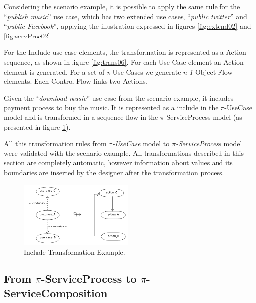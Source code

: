 \begin{exampl}
Considering the scenario example, it is possible to apply
the same rule for the ``\textit{publish music}'' use case, which has two
extended use cases, ``\textit{public twitter}'' and ``\textit{public
Facebook}'', applying the illustration expressed in figures \ref{fig:extend02}
and \ref{fig:servProc02}.  
\end{exampl}

For the {\sc Include} use case elements, the transformation is represented as a
{\sc Action} sequence, as shown in figure \ref{fig:trans06}. For each {\sc Use
Case} element an {\sc Action} element  is generated. For a set of \textit{n}
{\sc Use Cases} we generate \textit{n-1} {\sc Object Flow} elements. Each
{\sc Control Flow} links two {\sc Actions}. 


\begin{exampl}
Given the ``\textit{download music}'' use case from the scenario example, it
includes payment process to buy the music. It is represented as a include in the $\pi$-UseCase model and is
transformed in a sequence flow in the $\pi$-ServiceProcess model (as presented
in figure \ref{fig:include}).
\end{exampl}
  

All this transformation rules from \textit{$\pi$-UseCase} model to
\textit{$\pi$-ServiceProcess} model were validated with the scenario example.
All transformations described in this section are completely automatic, however
information about values and its boundaries are inserted by the designer after
the transformation process.


\begin{figure}[ht!]
\centering
\includegraphics[width=0.5\textwidth]{chapters/methodology/figs/include.pdf}
\caption{Include Transformation Example.}
\label{fig:include}
\end{figure}

\subsection{From $\pi$-ServiceProcess to
$\pi$-ServiceComposition}

